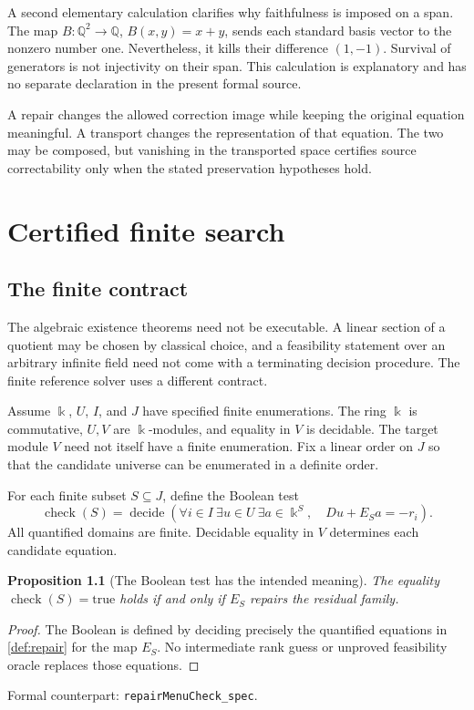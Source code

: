 \documentclass[11pt,letterpaper,oneside,openany]{book}
\theoremstyle{quiet}
\newtheorem{proposition}[theorem]{Proposition}
\newcommand{\kk}{\Bbbk}
\newcommand{\Q}{\mathbb{Q}}
\newcommand{\formal}[1]{\par\nobreak\begingroup\footnotesize\color{Slate}\sffamily Formal counterpart: \normalfont\nolinkurl{#1}.\par\endgroup}
\begin{document}
A second elementary calculation clarifies why faithfulness is imposed on a span. The map $B:\Q^2\to\Q$, $B(x,y)=x+y$, sends each standard basis vector to the nonzero number one. Nevertheless, it kills their difference $(1,-1)$. Survival of generators is not injectivity on their span. This calculation is explanatory and has no separate declaration in the present formal source.

\begin{scopebox}[title=Transport is not repair]
A repair changes the allowed correction image while keeping the original equation meaningful. A transport changes the representation of that equation. The two may be composed, but vanishing in the transported space certifies source correctability only when the stated preservation hypotheses hold.
\end{scopebox}

\chapter{Certified finite search}\label{ch:search}
\section{The finite contract}
The algebraic existence theorems need not be executable. A linear section of a quotient may be chosen by classical choice, and a feasibility statement over an arbitrary infinite field need not come with a terminating decision procedure. The finite reference solver uses a different contract.

Assume $\kk$, $U$, $I$, and $J$ have specified finite enumerations. The ring $\kk$ is commutative, $U,V$ are $\kk$-modules, and equality in $V$ is decidable. The target module $V$ need not itself have a finite enumeration. Fix a linear order on $J$ so that the candidate universe can be enumerated in a definite order.

For each finite subset $S\subseteq J$, define the Boolean test
\begin{equation}\label{eq:boolean-check}
\operatorname{check}(S)=\operatorname{decide}\left(
\forall i\in I\ \exists u\in U\ \exists a\in\kk^S,\quad Du+E_Sa=-r_i
\right).
\end{equation}
All quantified domains are finite. Decidable equality in $V$ determines each candidate equation.

\begin{proposition}[The Boolean test has the intended meaning]\label{prop:check}
The equality $\operatorname{check}(S)=\mathrm{true}$ holds if and only if $E_S$ repairs the residual family.
\end{proposition}
\begin{proof}
The Boolean is defined by deciding precisely the quantified equations in \cref{def:repair} for the map $E_S$. No intermediate rank guess or unproved feasibility oracle replaces those equations.
\end{proof}
\formal{repairMenuCheck_spec}
\end{document}
